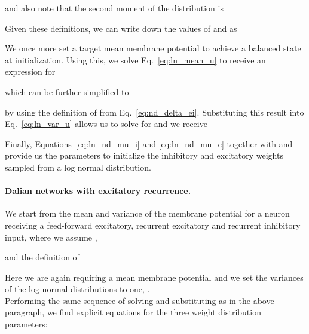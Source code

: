 \documentclass[11pt,a4paper]{article}
\begin{document}
\begin{refsection}
and also note that the second moment of the distribution is

Given these definitions, we can write down the values of  and  as

We once more set a target mean membrane potential  to achieve a balanced state at initialization. Using this, we solve Eq.~\eqref{eq:ln_mean_u} to receive an expression for 


which can be further simplified to 

by using the definition of  from Eq.~\eqref{eq:nd_delta_ei}.
Substituting this result into Eq.~\eqref{eq:ln_var_u} allows us to solve for  and we receive


Finally, Equations~\eqref{eq:ln_nd_mu_i} and \eqref{eq:ln_nd_mu_e} together with  and  provide us the parameters to initialize the inhibitory and excitatory weights sampled from a log normal distribution.
\paragraph{Dalian networks with excitatory recurrence.}
We start from the mean and variance of the membrane potential for a neuron receiving a feed-forward excitatory, recurrent excitatory and recurrent inhibitory input, where we assume ,

and the definition of 

Here we are again requiring a mean membrane potential  and we set the variances of the log-normal distributions to one, .\\
Performing the same sequence of solving and substituting as in the above paragraph, we find explicit equations for the three weight distribution parameters:


 
\printbibliography
\end{refsection}
\end{document}
